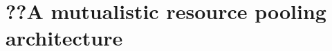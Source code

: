 \chapter{??A mutualistic resource pooling architecture}
\label{sec:malawi}

\renewcommand{\locfolder}{\chapfolder/malawi}





%
